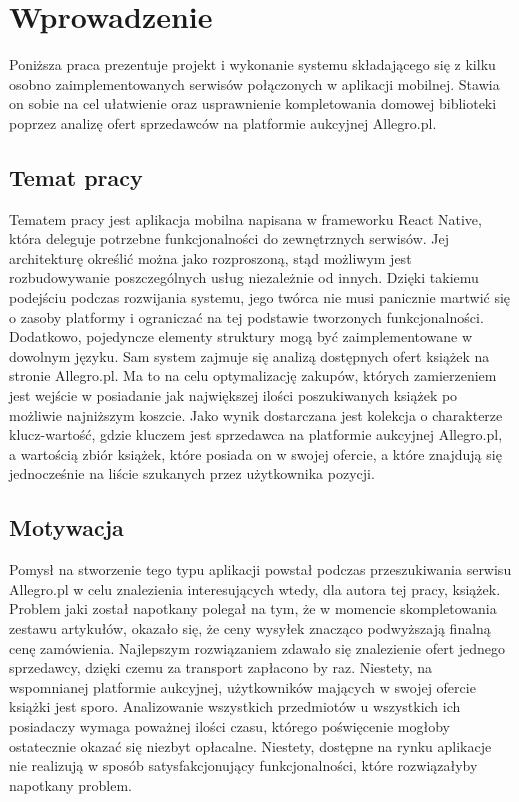 \chapter{Wprowadzenie}
\label{cha:wprowadzenie}

Poniższa praca prezentuje projekt i wykonanie systemu składającego się z kilku osobno zaimplementowanych serwisów połączonych w aplikacji mobilnej.
Stawia on sobie na cel ułatwienie oraz usprawnienie kompletowania domowej biblioteki poprzez analizę ofert sprzedawców na platformie aukcyjnej Allegro.pl.\newline
\newline

\section{Temat pracy}
\label{sec:tematPracy}

Tematem pracy jest aplikacja mobilna napisana w frameworku React Native, która deleguje potrzebne funkcjonalności do zewnętrznych serwisów. Jej architekturę określić można jako rozproszoną, stąd możliwym jest rozbudowywanie poszczególnych usług niezależnie od innych. Dzięki takiemu podejściu podczas rozwijania systemu, jego twórca nie musi panicznie martwić się o zasoby platformy i ograniczać na tej podstawie tworzonych funkcjonalności. Dodatkowo, pojedyncze elementy struktury mogą być zaimplementowane w dowolnym języku.\newline
Sam system zajmuje się analizą dostępnych ofert książek na stronie Allegro.pl. Ma to na celu optymalizację zakupów, których zamierzeniem jest wejście w posiadanie jak największej ilości poszukiwanych książek po możliwie najniższym koszcie.\newline
Jako wynik dostarczana jest kolekcja o charakterze klucz-wartość, gdzie kluczem jest sprzedawca na platformie aukcyjnej Allegro.pl, a wartością zbiór książek, które posiada on w swojej ofercie, a które znajdują się jednocześnie na liście szukanych przez użytkownika pozycji.
\newpage
\section{Motywacja}
\label{sec:motywacja}
Pomysł na stworzenie tego typu aplikacji powstał podczas przeszukiwania serwisu Allegro.pl w celu znalezienia interesujących wtedy, dla autora tej pracy, książek. Problem jaki został napotkany polegał na tym, że w momencie skompletowania zestawu artykułów, okazało się, że ceny wysyłek znacząco podwyższają finalną cenę zamówienia. Najlepszym rozwiązaniem zdawało się znalezienie ofert jednego sprzedawcy, dzięki czemu za transport zapłacono by raz. Niestety, na wspomnianej platformie aukcyjnej, użytkowników mających w swojej ofercie książki jest sporo. Analizowanie wszystkich przedmiotów u wszystkich ich posiadaczy wymaga poważnej ilości czasu, którego poświęcenie mogłoby ostatecznie okazać się niezbyt opłacalne.
Niestety, dostępne na rynku aplikacje nie realizują w sposób satysfakcjonujący funkcjonalności, które rozwiązałyby napotkany problem.

